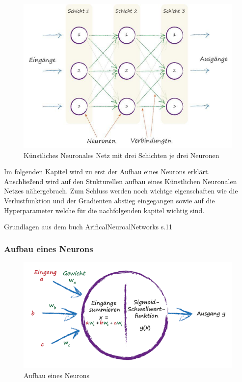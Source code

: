 \begin{figure}[htb]
  \centering  
  \includegraphics[scale=0.5]{img/S36_Buildyourown.png}
  \caption{Künstliches Neuronales Netz mit drei Schichten je drei Neuronen \cite{Rashid2017} }
  \label{fig:neural_network}
\end{figure}


Im folgenden Kapitel wird zu erst der Aufbau eines Neurons erklärt. Anschließend wird auf den Stukturellen aufbau eines  Künstlichen Neuronalen Netzes nähergebrach. Zum Schluss werden noch wichtge eigenschaften wie die Verlustfunktion und der Gradienten abstieg eingegangen sowie auf die Hyperparameter welche für die nachfolgenden kapitel wichtig sind.



Grundlagen aus dem buch ArificalNeuroalNetworks s.11 


\subsubsection{Aufbau eines Neurons}



\begin{figure}[htb]
  \centering  
  \includegraphics[scale=0.5]{img/S41_Buildyourown.png}
  \caption{Aufbau eines Neurons \cite{Rashid2017}}
  \label{fig:neuron}
\end{figure}

